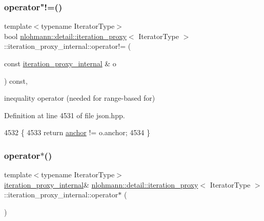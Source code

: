 \subsubsection{\texorpdfstring{operator"!=()}{operator!=()}}
{\footnotesize\ttfamily template$<$typename Iterator\+Type$>$ \\
bool \hyperlink{classnlohmann_1_1detail_1_1iteration__proxy}{nlohmann\+::detail\+::iteration\+\_\+proxy}$<$ Iterator\+Type $>$\+::iteration\+\_\+proxy\+\_\+internal\+::operator!= (\begin{DoxyParamCaption}\item[{const \hyperlink{classnlohmann_1_1detail_1_1iteration__proxy_1_1iteration__proxy__internal}{iteration\+\_\+proxy\+\_\+internal} \&}]{o }\end{DoxyParamCaption}) const\hspace{0.3cm}{\ttfamily [inline]}, {\ttfamily [noexcept]}}



inequality operator (needed for range-\/based for) 



Definition at line 4531 of file json.\+hpp.


\begin{DoxyCode}
4532         \{
4533             \textcolor{keywordflow}{return} \hyperlink{classnlohmann_1_1detail_1_1iteration__proxy_1_1iteration__proxy__internal_a994faf46a2f04ecb85d17b74641611a6}{anchor} != o.anchor;
4534         \}
\end{DoxyCode}
\mbox{\label{classnlohmann_1_1detail_1_1iteration__proxy_1_1iteration__proxy__internal_a008e69c6ba945489720a946619dcc620}} 
\subsubsection{\texorpdfstring{operator$\ast$()}{operator*()}}
{\footnotesize\ttfamily template$<$typename Iterator\+Type$>$ \\
\hyperlink{classnlohmann_1_1detail_1_1iteration__proxy_1_1iteration__proxy__internal}{iteration\+\_\+proxy\+\_\+internal}\& \hyperlink{classnlohmann_1_1detail_1_1iteration__proxy}{nlohmann\+::detail\+::iteration\+\_\+proxy}$<$ Iterator\+Type $>$\+::iteration\+\_\+proxy\+\_\+internal\+::operator$\ast$ (\begin{DoxyParamCaption}{ }\end{DoxyParamCaption})\hspace{0.3cm}{\ttfamily [inline]}}



